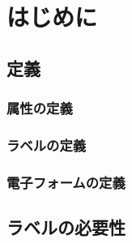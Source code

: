 \chapter{はじめに}\label{cha:Introduction}



\section{定義}\label{sec:definition}

\subsection{属性の定義}\label{subsec:attribute_definition}

\subsection{ラベルの定義}\label{subsec:label_definition}

\subsection{電子フォームの定義}\label{subsec:electronic_form_definition}


\section{ラベルの必要性}\label{sec:label_necessity}